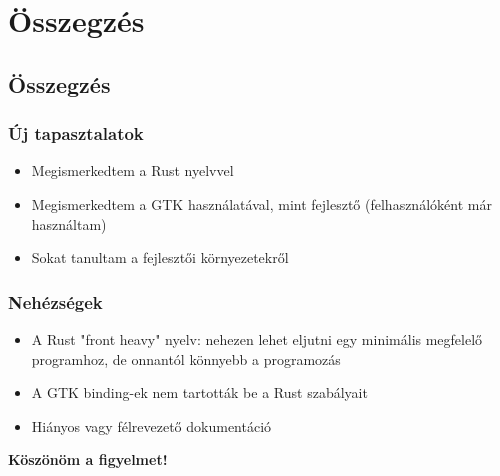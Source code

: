 \documentclass{beamer}
\begin{document}
    \section{Összegzés}
    \subsection{Összegzés}

    \begin{frame}[fragile]
        \frametitle{Új tapasztalatok}

        \begin{itemize}
            \item Megismerkedtem a Rust nyelvvel
            \item Megismerkedtem a GTK használatával, mint fejlesztő (felhasználóként már használtam)
            \item Sokat tanultam a fejlesztői környezetekről
        \end{itemize}
    \end{frame}

    \begin{frame}[fragile]
        \frametitle{Nehézségek}

        \begin{itemize}
            \item A Rust "front heavy" nyelv: nehezen lehet eljutni egy minimális megfelelő programhoz, de onnantól könnyebb a programozás
            \item A GTK binding-ek nem tartották be a Rust szabályait
            \item Hiányos vagy félrevezető dokumentáció
        \end{itemize}
    \end{frame}

    \begin{frame}[fragile]
        \begin{center}
            \Large \textbf{Köszönöm a figyelmet!}
        \end{center}
    \end{frame}
\end{document}
